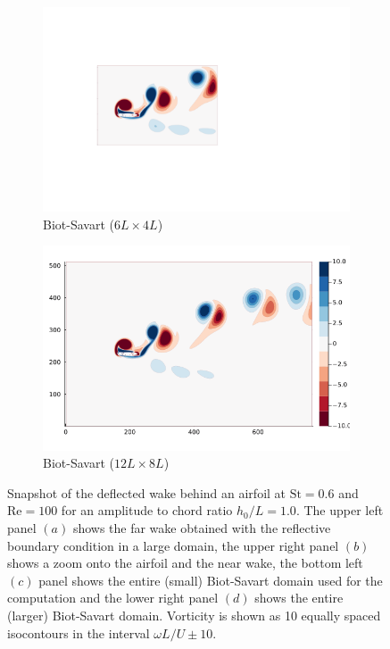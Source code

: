 \documentclass[final,1p,times]{elsarticle}
\begin{document}
\begin{figure}
\begin{subfigure}{.48\textwidth}
        \includegraphics[trim={2.8cm 2cm 4cm 2cm},clip,width=\textwidth]{tex/fig/Deflected_wake_snap_BS.png}
        \caption{Biot-Savart ($6L\times4L$)}
    \end{subfigure}%
    \hspace{0.1cm}
    \begin{subfigure}{.48\textwidth}
        \centering
        \includegraphics[trim={2.8cm 2cm 4cm 2cm},clip,width=\textwidth]{tex//fig/Deflected_wake_snap_BS_2x.png}
        \caption{Biot-Savart ($12L\times8L$)}
    \end{subfigure}
    \caption{Snapshot of the deflected wake behind an airfoil at $\text{St}=0.6$ and $\text{Re}=100$ for an amplitude to chord ratio $h_0/L=1.0$. The upper left panel $(a)$ shows the far wake obtained with the reflective boundary condition in a large domain, the upper right panel $(b)$ shows a zoom onto the airfoil and the near wake, the bottom left $(c)$ panel shows the entire (small) Biot-Savart domain used for the computation and the lower right panel $(d)$ shows the entire (larger) Biot-Savart domain. Vorticity is shown as 10 equally spaced isocontours in the interval $\omega L/U \pm 10$.}
    \label{fig:deflected_wake}
\end{figure}
\end{document}
